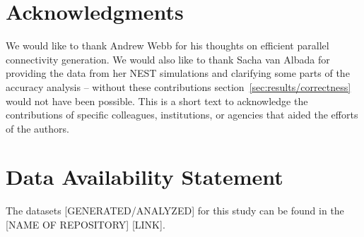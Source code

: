 \documentclass[utf8]{frontiersSCNS} %
\begin{document}
\section*{Acknowledgments}
We would like to thank Andrew Webb for his thoughts on efficient parallel connectivity generation.
We would also like to thank Sacha van Albada for providing the data from her NEST simulations and clarifying some parts of the accuracy analysis -- without these contributions section~\ref{sec:results/correctness} would not have been possible.
This is a short text to acknowledge the contributions of specific colleagues, institutions, or agencies that aided the efforts of the authors.

\section*{Data Availability Statement}
The datasets [GENERATED/ANALYZED] for this study can be found in the [NAME OF REPOSITORY] [LINK].
%



\end{document}
